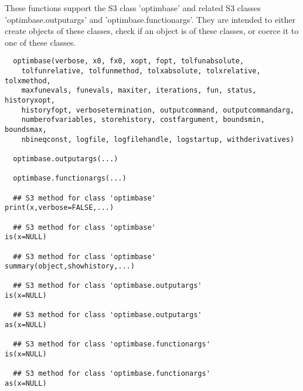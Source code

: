 %
\begin{Description}\relax
These functions support the S3 class 'optimbase' and related S3 classes 
'optimbase.outputargs' and 'optimbase.functionargs'. They are intended to 
either create objects of these classes, check if an object is of these classes, 
or coerce it to one of these classes.
\end{Description}
%
\begin{Usage}
\begin{verbatim}
  optimbase(verbose, x0, fx0, xopt, fopt, tolfunabsolute, 
    tolfunrelative, tolfunmethod, tolxabsolute, tolxrelative, tolxmethod, 
    maxfunevals, funevals, maxiter, iterations, fun, status, historyxopt,
    historyfopt, verbosetermination, outputcommand, outputcommandarg,
    numberofvariables, storehistory, costfargument, boundsmin, boundsmax,
    nbineqconst, logfile, logfilehandle, logstartup, withderivatives)
  
  optimbase.outputargs(...)
  
  optimbase.functionargs(...)
  
  ## S3 method for class 'optimbase'
print(x,verbose=FALSE,...)
  
  ## S3 method for class 'optimbase'
is(x=NULL)
  
  ## S3 method for class 'optimbase'
summary(object,showhistory,...)
  
  ## S3 method for class 'optimbase.outputargs'
is(x=NULL)
  
  ## S3 method for class 'optimbase.outputargs'
as(x=NULL)
  
  ## S3 method for class 'optimbase.functionargs'
is(x=NULL)
  
  ## S3 method for class 'optimbase.functionargs'
as(x=NULL)
  
\end{verbatim}
\end{Usage}
